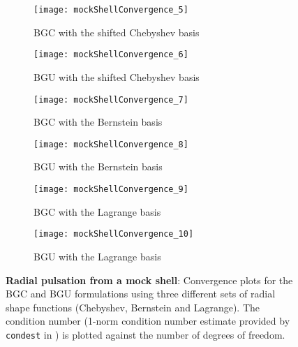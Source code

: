 \begin{figure}
	\begin{subfigure}{0.49\textwidth}
		\centering
		\texttt{[image: mockShellConvergence\_5]}
		\caption{BGC with the shifted Chebyshev basis}
	\end{subfigure}%
	\hspace*{0.02\textwidth}%
	\begin{subfigure}{0.49\textwidth}
		\centering
		\texttt{[image: mockShellConvergence\_6]}
		\caption{BGU with the shifted Chebyshev basis}
	\end{subfigure}
	\par\bigskip
	\begin{subfigure}{0.49\textwidth}
		\centering
		\texttt{[image: mockShellConvergence\_7]}
		\caption{BGC with the Bernstein basis}
	\end{subfigure}%
	\hspace*{0.02\textwidth}%
	\begin{subfigure}{0.49\textwidth}
		\centering
		\texttt{[image: mockShellConvergence\_8]}
		\caption{BGU with the Bernstein basis}
	\end{subfigure}
	\par\bigskip
	\begin{subfigure}{0.49\textwidth}
		\centering
		\texttt{[image: mockShellConvergence\_9]}
		\caption{BGC with the Lagrange basis}
	\end{subfigure}%
	\hspace*{0.02\textwidth}%
	\begin{subfigure}{0.49\textwidth}
		\centering
		\texttt{[image: mockShellConvergence\_10]}
		\caption{BGU with the Lagrange basis}
	\end{subfigure}
	\caption{\textbf{Radial pulsation from a mock shell}: Convergence plots for the BGC and BGU formulations using three different sets of radial shape functions (Chebyshev, Bernstein and Lagrange). The condition number (1-norm condition number estimate provided by \texttt{condest} in \MATLAB) is plotted against the number of degrees of freedom.}
	\label{Fig2:MS_condNumbersB}
\end{figure}


